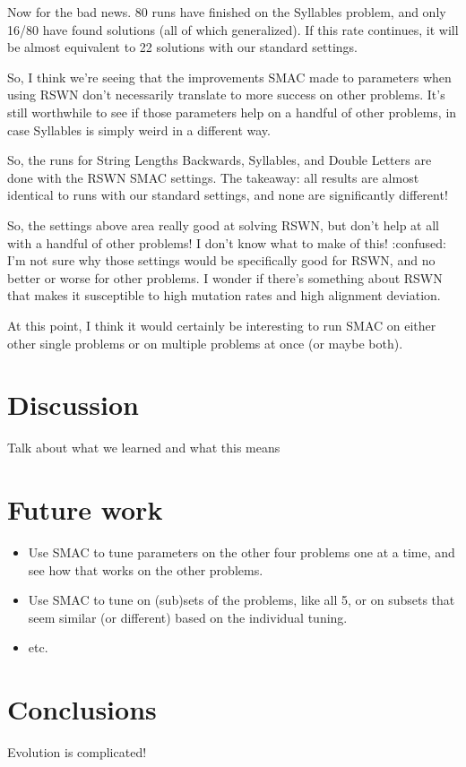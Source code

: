 Now for the bad news. 80 runs have finished on the Syllables problem, and only 16/80 have found solutions (all of which generalized). If this rate continues, it will be almost equivalent to 22 solutions with our standard settings.

So, I think we're seeing that the improvements SMAC made to parameters when using RSWN don't necessarily translate to more success on other problems. It's still worthwhile to see if those parameters help on a handful of other problems, in case Syllables is simply weird in a different way.

So, the runs for String Lengths Backwards, Syllables, and Double Letters are done with the RSWN SMAC settings. The takeaway: all results are almost identical to runs with our standard settings, and none are significantly different!

So, the settings above area really good at solving RSWN, but don't help at all with a handful of other problems! I don't know what to make of this! :confused: I'm not sure why those settings would be specifically good for RSWN, and no better or worse for other problems. I wonder if there's something about RSWN that makes it susceptible to high mutation rates and high alignment deviation.

At this point, I think it would certainly be interesting to run SMAC on either other single problems or on multiple problems at once (or maybe both).

\section{Discussion}
\label{sec:discussion}

Talk about what we learned and what this means

\section{Future work}
\label{sec:futureWork}

\begin{itemize}
	\item Use SMAC to tune parameters on the other four problems one at a time, and see how that works on the other problems.
	\item Use SMAC to tune on (sub)sets of the problems, like all 5, or on subsets that seem similar (or different) based on the individual tuning.
	\item etc.
\end{itemize}

\section{Conclusions}
\label{sec:conclusion}

Evolution is complicated!

